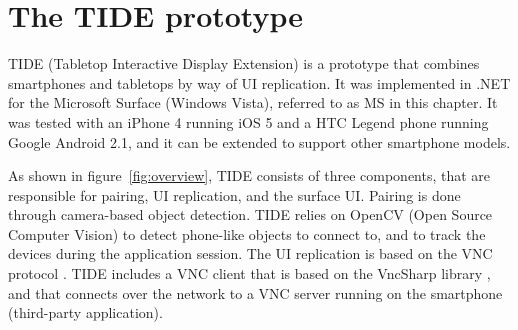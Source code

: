 

\chapter{The TIDE prototype}
\label{system}

TIDE (Tabletop Interactive Display Extension) is a prototype that combines smartphones and tabletops by way of UI replication.
It was implemented in .NET for the Microsoft Surface (Windows Vista), referred to as MS in this chapter.
It was tested with an iPhone 4 running iOS 5 and a HTC Legend phone running Google Android 2.1, and it can be extended to support other smartphone models.

As shown in figure~\ref{fig:overview}, TIDE consists of three components, that are responsible for pairing, UI replication, and the surface UI.
Pairing is done through camera-based object detection.
TIDE relies on OpenCV (Open Source Computer Vision) \citep{opencv} to detect phone-like objects to connect to, and to track the devices during the application session.
The UI replication is based on the VNC protocol \citep{Richardson:1998:vnc}.
TIDE includes a VNC client that is based on the VncSharp library \citep{vncsharp}, and that connects over the network to a VNC server running on the smartphone (third-party application).

